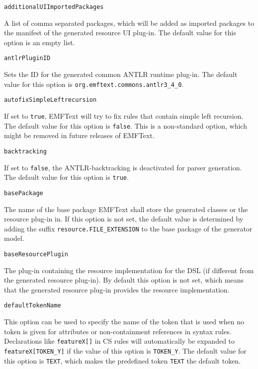\noindent\texttt{additionalUIImportedPackages}
\begin{myindentpar}{1cm}
A list of comma separated packages, which will be added as imported packages to the manifest of the generated resource UI plug-in. The default value for this option is an empty list.
\end{myindentpar}

\noindent\texttt{antlrPluginID}
\begin{myindentpar}{1cm}
Sets the ID for the generated common ANTLR runtime plug-in. The default value for this option is \texttt{org.emftext.commons.antlr3\_4\_0}.
\end{myindentpar}

\noindent\texttt{autofixSimpleLeftrecursion}
\begin{myindentpar}{1cm}
If set to \texttt{true}, EMFText will try to fix rules that contain simple left recursion. The default value for this option is \texttt{false}. This is a non-standard option, which might be removed in future releases of EMFText.
\end{myindentpar}

\noindent\texttt{backtracking}
\begin{myindentpar}{1cm}
If set to \texttt{false}, the ANTLR-backtracking is deactivated for parser generation. The default value for this option is \texttt{true}.
\end{myindentpar}

\noindent\texttt{basePackage}
\begin{myindentpar}{1cm}
The name of the base package EMFText shall store the generated classes or the resource plug-in in. If this option is not set, the default value is determined by adding the suffix \texttt{resource.FILE\_EXTENSION} to the base package of the generator model.
\end{myindentpar}

\noindent\texttt{baseResourcePlugin}
\begin{myindentpar}{1cm}
The plug-in containing the resource implementation for the DSL (if different from the generated resource plug-in). By default this option is not set, which means that the generated resource plug-in provides the resource implementation.
\end{myindentpar}

\noindent\texttt{defaultTokenName}
\begin{myindentpar}{1cm}
This option can be used to specify the name of the token that is used when no token is given for attributes or non-containment references in syntax rules. Declarations like \texttt{featureX[]} in CS rules will automatically be expanded to \texttt{featureX[TOKEN\_Y]} if the value of this option is \texttt{TOKEN\_Y}. The default value for this option is \texttt{TEXT}, which makes the predefined token \texttt{TEXT} the default token.
\end{myindentpar}

